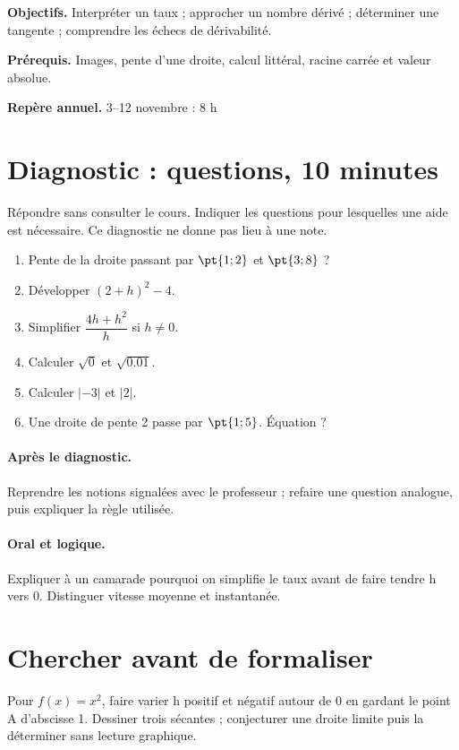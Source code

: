 \label{C04}
\begin{keypoint}
\textbf{Objectifs.} Interpréter un taux ; approcher un nombre dérivé ; déterminer une tangente ; comprendre les échecs de dérivabilité.

\textbf{Prérequis.} Images, pente d’une droite, calcul littéral, racine carrée et valeur absolue.

\textbf{Repère annuel.} 3–12 novembre : 8 h\end{keypoint}
\section*{Diagnostic :  questions, 10 minutes}\label{C04-D}
Répondre sans consulter le cours. Indiquer les questions pour lesquelles une aide est nécessaire. Ce diagnostic ne donne pas lieu à une note.
\begin{enumerate}
\item Pente de la droite passant par $\pt{1;2}$ et $\pt{3;8}$ ?
\item Développer $(2+h)^2-4$.
\item Simplifier $\dfrac{4h+h^2}{h}$ si $h\ne0$.
\item Calculer $\sqrt0$ et $\sqrt{\num{0,01}}$.
\item Calculer $|-3|$ et $|2|$.
\item Une droite de pente 2 passe par $\pt{1;5}$. Équation ?
\end{enumerate}
\paragraph{Après le diagnostic.} Reprendre les notions signalées avec le professeur ; refaire une question analogue, puis expliquer la règle utilisée.
\paragraph{Oral et logique.} Expliquer à un camarade pourquoi on simplifie le taux avant de faire tendre h vers 0. Distinguer vitesse moyenne et instantanée.
\mxnewpage
\section*{Chercher avant de formaliser}\label{C04-RECH}
Pour $f(x)=x^2$, faire varier h positif et négatif autour de 0 en gardant le point A d’abscisse 1. Dessiner trois sécantes ; conjecturer une droite limite puis la déterminer sans lecture graphique.
